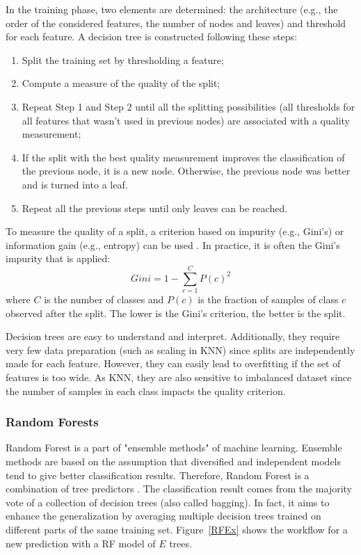 \documentclass[a4paper,10pt]{article}
\begin{document}
In the training phase, two elements are determined: the architecture (e.g., the order of the considered features, the number of nodes and leaves) and threshold for each feature.
A decision tree is constructed following these steps:
\begin{enumerate}
\item Split the training set by thresholding a feature;
\item Compute a measure of the quality of the split;
\item Repeat Step 1 and Step 2 until all the splitting possibilities (all thresholds for all features that wasn't used in previous nodes) are associated with a quality measurement;
\item If the split with the best quality measurement improves the classification of the previous node, it is a new node. Otherwise, the previous node was better and is turned into a leaf.
\item Repeat all the previous steps until only leaves can be reached.
\end{enumerate}

To measure the quality of a split, a criterion based on impurity (e.g., Gini's) or information gain (e.g., entropy) can be used \cite{dangeti2017statistics}. In practice, it is often the Gini's impurity that is applied:
\begin{equation}
Gini = 1 - \sum_{c=1}^C P(c)^2
\end{equation}
where $C$ is the number of classes and $P(c)$ is the fraction of samples of class $c$ observed after the split. The lower is the Gini's criterion, the better is the split.

Decision trees are easy to understand and interpret. Additionally, they require very few data preparation (such as scaling in KNN) since splits are independently made for each feature. However, they can easily lead to overfitting if the set of features is too wide. As KNN, they are also sensitive to imbalanced dataset since the number of samples in each class impacts the quality criterion.

\subsubsection{Random Forests}

Random Forest is a part of "ensemble methods" of machine learning. Ensemble methods are based on the assumption that diversified and independent models tend to give better classification results. Therefore, Random Forest is a combination of tree predictors \cite{breiman2001random}. The classification result comes from the majority vote of a collection of decision trees (also called bagging). In fact, it aims to enhance the generalization by averaging multiple decision trees trained on different parts of the same training set. Figure~\ref{RFEx} shows the workflow for a new prediction with a RF model of $E$ trees.
\end{document}
